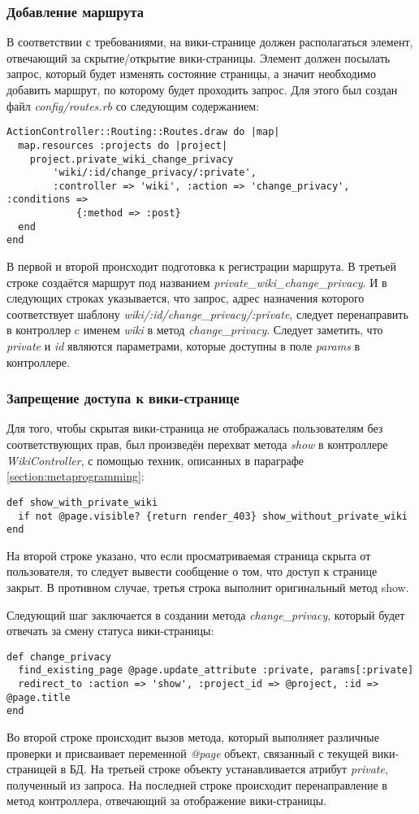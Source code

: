 \subsubsection{Добавление маршрута}
В соответствии с требованиями, на вики-странице должен располагаться элемент,
отвечающий за скрытие/открытие вики-страницы. Элемент должен посылать запрос,
который будет изменять состояние страницы, а значит необходимо добавить
маршрут, по которому будет проходить запрос. Для этого был создан файл
\textit{config/routes.rb} со следующим содержанием:
\small{\begin{lstlisting}
ActionController::Routing::Routes.draw do |map|
  map.resources :projects do |project|
    project.private_wiki_change_privacy
        'wiki/:id/change_privacy/:private',
        :controller => 'wiki', :action => 'change_privacy',  :conditions =>
            {:method => :post}
  end
end
\end{lstlisting}}
В первой и второй происходит подготовка к регистрации маршрута. В третьей
строке создаётся маршрут под названием \textit{private\_wiki\_change\_privacy}.
И в следующих строках указывается, что запрос, адрес назначения которого
соответствует шаблону \textit{wiki/:id/change\_privacy/:private}, следует
перенаправить в контроллер c именем \textit{wiki} в метод
\textit{change\_privacy}. Следует заметить, что \textit{private} и \textit{id}
являются параметрами, которые доступны в поле \textit{params} в контроллере.

\subsubsection{Запрещение доступа к вики-странице}
Для того, чтобы скрытая вики-страница не отображалась пользователям без
соответствующих прав, был произведён перехват метода \textit{show} в
контроллере \textit{WikiController}, с помощью техник, описанных в параграфе
\ref{section:metaprogramming}:
\small{\begin{lstlisting}
def show_with_private_wiki
  if not @page.visible? {return render_403} show_without_private_wiki
end
\end{lstlisting}}
На второй строке указано, что если просматриваемая страница скрыта от
пользователя, то следует вывести сообщение о том, что доступ к странице закрыт.
В противном случае, третья строка выполнит оригинальный метод show.

Следующий шаг заключается в создании метода \textit{change\_privacy}, который
будет отвечать за смену статуса вики-страницы:
\small{\begin{lstlisting}
def change_privacy
  find_existing_page @page.update_attribute :private, params[:private]
  redirect_to :action => 'show', :project_id => @project, :id => @page.title
end
\end{lstlisting}}
Во второй строке происходит вызов метода, который выполняет различные проверки
и присваивает переменной \textit{@page} объект, связанный с текущей
вики-страницей в БД.
На третьей строке объекту устанавливается атрибут \textit{private}, полученный
из запроса. На последней строке происходит перенаправление в метод контроллера,
отвечающий за отображение вики-страницы.

